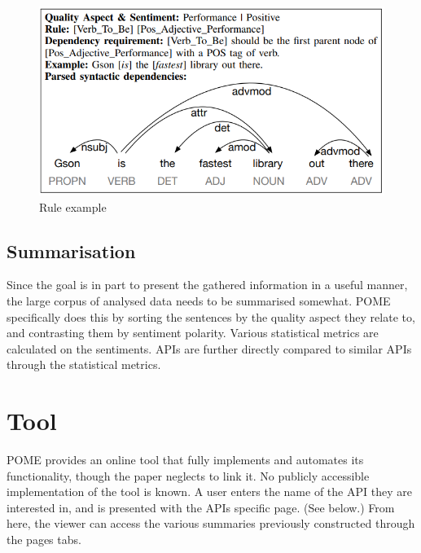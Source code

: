 \documentclass[a4paper,10pt, bibliography=totocnumbered]{scrreprt}
\begin{document}
\begin{figure}[!h]
    \centering
    \includegraphics[scale=0.6]{../images/Thema9_Regel.PNG}
    \caption{Rule example}
    \label{POMERule}
\end{figure}

\subsection{Summarisation}

Since the goal is in part to present the gathered information in a useful manner, the large corpus of analysed data needs to be summarised somewhat. POME specifically does this by sorting the sentences by the quality aspect they relate to, and contrasting them by sentiment polarity. Various statistical metrics are calculated on the sentiments. APIs are further directly compared to similar APIs through the statistical metrics.

\section{Tool}

POME provides an online tool that fully implements and automates its functionality, though the paper neglects to link it. No publicly accessible implementation of the tool is known. A user enters the name of the API they are interested in, and is presented with the APIs specific page. (See below.) From here, the viewer can access the various summaries previously constructed through the pages tabs. 
\end{document}

